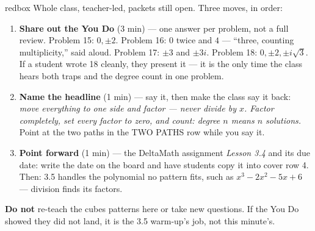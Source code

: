 \documentclass[10pt]{article}
\begin{document}
\boxguard[20]
\begin{skillbox}{redbox}
Whole class, teacher-led, packets still open. Three moves, in order:
\begin{enumerate}[itemsep=3pt]
  \item \textbf{Share out the You Do} (3 min) --- one answer per problem, not a full review.
        Problem 15: $0, \pm 2$. Problem 16: $0$ twice and $4$ --- ``three, counting
        multiplicity,'' said aloud. Problem 17: $\pm 3$ and $\pm 3i$. Problem 18: $0, \pm 2,
        \pm i\sqrt{3}$. If a student wrote 18 cleanly, they present it --- it is the only
        time the class hears both traps and the degree count in one problem.
  \item \textbf{Name the headline} (1 min) --- say it, then make the class say it back:
        \textit{move everything to one side and factor --- never divide by $x$. Factor
        completely, set every factor to zero, and count: degree $n$ means $n$ solutions.}
        Point at the two paths in the TWO PATHS row while you say it.
  \item \textbf{Point forward} (1 min) --- the DeltaMath assignment \textit{Lesson 3.4} and its
        due date: write the date on the board and have students copy it into cover row 4.
        Then: 3.5 handles the polynomial no pattern fits, such as $x^3 - 2x^2 - 5x + 6$ ---
        division finds its factors.
\end{enumerate}
\textbf{Do not} re-teach the cubes patterns here or take new questions. If the You Do showed
they did not land, it is the 3.5 warm-up's job, not this minute's.
\end{skillbox}
\end{document}
